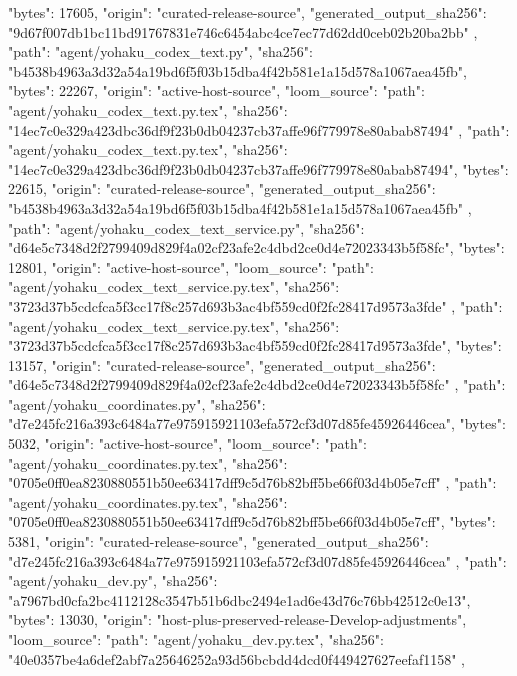 {{      "bytes": 17605,
      "origin": "curated-release-source",
      "generated_output_sha256": "9d67f007db1bc11bd91767831e746c6454abc4ce7ec77d62dd0ceb02b20ba2bb"
    },
    {
      "path": "agent/yohaku_codex_text.py",
      "sha256": "b4538b4963a3d32a54a19bd6f5f03b15dba4f42b581e1a15d578a1067aea45fb",
      "bytes": 22267,
      "origin": "active-host-source",
      "loom_source": {
        "path": "agent/yohaku_codex_text.py.tex",
        "sha256": "14ec7c0e329a423dbc36df9f23b0db04237cb37affe96f779978e80abab87494"
      }
    },
    {
      "path": "agent/yohaku_codex_text.py.tex",
      "sha256": "14ec7c0e329a423dbc36df9f23b0db04237cb37affe96f779978e80abab87494",
      "bytes": 22615,
      "origin": "curated-release-source",
      "generated_output_sha256": "b4538b4963a3d32a54a19bd6f5f03b15dba4f42b581e1a15d578a1067aea45fb"
    },
    {
      "path": "agent/yohaku_codex_text_service.py",
      "sha256": "d64e5c7348d2f2799409d829f4a02cf23afe2c4dbd2ce0d4e72023343b5f58fc",
      "bytes": 12801,
      "origin": "active-host-source",
      "loom_source": {
        "path": "agent/yohaku_codex_text_service.py.tex",
        "sha256": "3723d37b5cdcfca5f3cc17f8c257d693b3ac4bf559cd0f2fc28417d9573a3fde"
      }
    },
    {
      "path": "agent/yohaku_codex_text_service.py.tex",
      "sha256": "3723d37b5cdcfca5f3cc17f8c257d693b3ac4bf559cd0f2fc28417d9573a3fde",
      "bytes": 13157,
      "origin": "curated-release-source",
      "generated_output_sha256": "d64e5c7348d2f2799409d829f4a02cf23afe2c4dbd2ce0d4e72023343b5f58fc"
    },
    {
      "path": "agent/yohaku_coordinates.py",
      "sha256": "d7e245fc216a393c6484a77e975915921103efa572cf3d07d85fe45926446cea",
      "bytes": 5032,
      "origin": "active-host-source",
      "loom_source": {
        "path": "agent/yohaku_coordinates.py.tex",
        "sha256": "0705e0ff0ea8230880551b50ee63417dff9c5d76b82bff5be66f03d4b05e7cff"
      }
    },
    {
      "path": "agent/yohaku_coordinates.py.tex",
      "sha256": "0705e0ff0ea8230880551b50ee63417dff9c5d76b82bff5be66f03d4b05e7cff",
      "bytes": 5381,
      "origin": "curated-release-source",
      "generated_output_sha256": "d7e245fc216a393c6484a77e975915921103efa572cf3d07d85fe45926446cea"
    },
    {
      "path": "agent/yohaku_dev.py",
      "sha256": "a7967bd0cfa2bc4112128c3547b51b6dbc2494e1ad6e43d76c76bb42512c0e13",
      "bytes": 13030,
      "origin": "host-plus-preserved-release-Develop-adjustments",
      "loom_source": {
        "path": "agent/yohaku_dev.py.tex",
        "sha256": "40e0357be4a6def2abf7a25646252a93d56bcbdd4dcd0f449427627eefaf1158"
      }
    },
}
